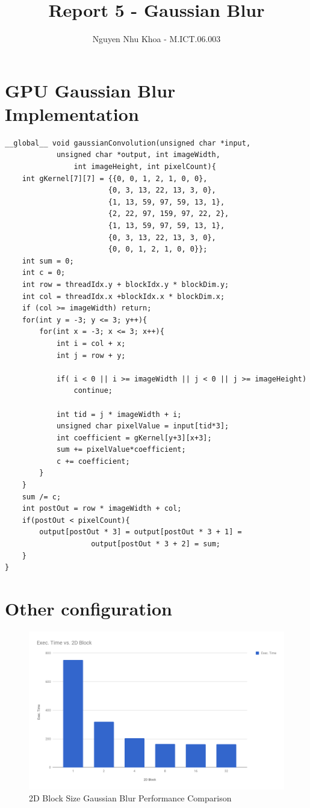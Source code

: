 \documentclass[a4paper,11pt, notitlepage]{article}
\begin{document}
\title{
\vspace{-3cm}
Report 5 - Gaussian Blur}
\author{Nguyen Nhu Khoa - M.ICT.06.003}
\maketitle

\pagestyle{plain}
\setcounter{page}{1}

\vspace{-1cm}
\noindent
\section{GPU Gaussian Blur Implementation}
\begin{flushleft}
\small
\begin{BVerbatim}
__global__ void gaussianConvolution(unsigned char *input, 
			unsigned char *output, int imageWidth, 
				int imageHeight, int pixelCount){
    int gKernel[7][7] = {{0, 0, 1, 2, 1, 0, 0},
                        {0, 3, 13, 22, 13, 3, 0},
                        {1, 13, 59, 97, 59, 13, 1},
                        {2, 22, 97, 159, 97, 22, 2},
                        {1, 13, 59, 97, 59, 13, 1},
                        {0, 3, 13, 22, 13, 3, 0},
                        {0, 0, 1, 2, 1, 0, 0}};
    int sum = 0;
    int c = 0;
    int row = threadIdx.y + blockIdx.y * blockDim.y;
    int col = threadIdx.x +blockIdx.x * blockDim.x;
    if (col >= imageWidth) return;
    for(int y = -3; y <= 3; y++){
        for(int x = -3; x <= 3; x++){
            int i = col + x;
            int j = row + y;

            if( i < 0 || i >= imageWidth || j < 0 || j >= imageHeight)
                continue;

            int tid = j * imageWidth + i;
            unsigned char pixelValue = input[tid*3];
            int coefficient = gKernel[y+3][x+3];
            sum += pixelValue*coefficient;
            c += coefficient;
        }
    }
    sum /= c;
    int postOut = row * imageWidth + col;
    if(postOut < pixelCount){
    	output[postOut * 3] = output[postOut * 3 + 1] = 
    				output[postOut * 3 + 2] = sum;
    }
}
\end{BVerbatim}
\end{flushleft}

\section{Other configuration}
\begin{figure}[H]
\includegraphics[width=15cm]{chart-gaussian.png}
\centering
\caption{2D Block Size Gaussian Blur Performance Comparison}
\end{figure}
\end{document}
